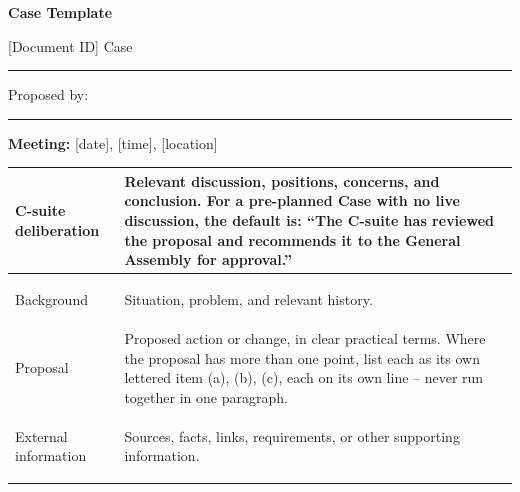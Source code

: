 \documentclass{../../Common/Latex/Templates/rapport}
\newcommand{\meetingline}{\textbf{Meeting:} [date], [time], [location]}
\begin{document}
\reportmainmatter
\small
\setlength{\parindent}{0pt}
\setlength{\tabcolsep}{6pt}
\renewcommand{\arraystretch}{1.2}

\begin{center}
  {\Large\bfseries Case Template}\par
  \vspace{0.15cm}
  {\normalsize [Document ID] \textperiodcentered{} Case \rule{1cm}{0.4pt} \textperiodcentered{} Proposed by: \rule{4cm}{0.4pt}}\par
  \vspace{0.1cm}
  {\small \meetingline}\par
\end{center}

\vspace{0.3cm}
\begin{tabularx}{\textwidth}{|>{\bfseries\raggedright\arraybackslash}p{4.2cm}|X|}
  \hline
  C-suite deliberation & \rule{0pt}{4.1cm}Relevant discussion, positions, concerns, and conclusion. For a pre-planned Case with no live discussion, the default is: ``The C-suite has reviewed the proposal and recommends it to the General Assembly for approval.''             \\
  \hline
  Background           & \rule{0pt}{4.1cm}Situation, problem, and relevant history.                             \\
  \hline
  Proposal             & \rule{0pt}{4.1cm}Proposed action or change, in clear practical terms. Where the proposal has more than one point, list each as its own lettered item (a), (b), (c), each on its own line -- never run together in one paragraph. \\
  \hline
  External information & \rule{0pt}{4.1cm}Sources, facts, links, requirements, or other supporting information. \\
  \hline
\end{tabularx}
\end{document}
